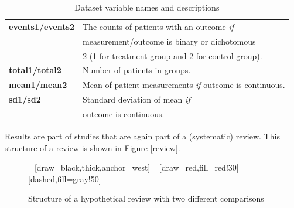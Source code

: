 \documentclass[11pt,a4paper,twoside]{book}\usepackage[]{graphicx}\usepackage[]{color}
\begin{document}
\begin{table}[ht]
\begin{center}
\begin{tabular}{l l}
      \textbf{events1/events2} & The counts of patients with an outcome \textit{if}\\ &measurement/outcome is binary or dichotomous \\ &2 (1 for treatment group and 2 for control group).\\
      \textbf{total1/total2} & Number of patients in groups.\\
      \textbf{mean1/mean2} & Mean of patient measurements \textit{if} outcome is continuous.\\
      \textbf{sd1/sd2} & Standard deviation of mean \textit{if} \\ &outcome is continuous.
    \end{tabular}
  \caption{Dataset variable names and descriptions  \label{variable}}

  \end{center}
\end{table}

Results are part of studies that are again part of a (systematic) review. This structure of a review is shown in Figure \ref{review}. 

\begin{figure}
=[draw=black,thick,anchor=west]
=[draw=red,fill=red!30]
=[dashed,fill=gray!50]
\caption{Structure of a hypothetical review with two different comparisons\label{review.structure}}
\label{review.structure}
\end{figure}
\end{document}
